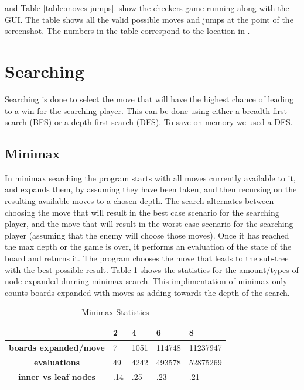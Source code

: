 \documentclass{article}
\begin{document}
 and Table \ref{table:moves-jumps}. show the checkers game running along with the GUI.
The table shows all the valid possible moves and jumps at the point of the
screenshot. The numbers in the table correspond to the location in .

\section{Searching}

Searching is done to select the move that will have the highest chance of
leading to a win for the searching player.  This can be done using either a
breadth first search (BFS) or a depth first search (DFS). To save on memory
we used a DFS.

\subsection{Minimax}

In minimax searching the program starts with all moves currently available to
it, and expands them, by assuming they have been taken, and then recursing on
the resulting available moves to a chosen depth. The search alternates between
choosing the move that will result in the best case scenario for the searching
player, and the move that will result in the worst case scenario for the
searching player (assuming that the enemy will choose those moves). Once it has
reached the max depth or the game is over, it performs an evaluation of the
state of the board and returns it. The program chooses the move that leads to
the sub-tree with the best possible result. Table \ref{minimax-stats} shows the
statistics for the amount/types of node expanded durning minimax search. This
implimentation of minimax only counts boards expanded with moves as adding towards
the depth of the search.

\begin{table}[]
\centering
\caption{Minimax Statistics}
\label{minimax-stats}
\begin{tabular}{|l|l|l|l|l|}
\hline
& \textbf{2} & \textbf{4} & \textbf{6} & \textbf{8} \\ \hline
\textbf{boards expanded/move}                      & 7   & 1051 & 114748 & 11237947 \\ \hline
\multicolumn{1}{|c|}{\textbf{ evaluations}}        & 49  & 4242 & 493578 & 52875269 \\ \hline
\multicolumn{1}{|c|}{\textbf{ inner vs leaf nodes}} & .14 & .25  & .23    & .21      \\ \hline
\end{tabular}
\end{table}
\end{document}
